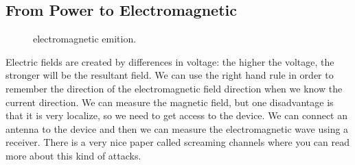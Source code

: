 \subsection { From Power to Electromagnetic }
\begin{figure}[h]
    \centering
    
    \caption{electromagnetic emition.} \label{fig:flipflop}
\end{figure}
Electric fields are created by differences in voltage: the higher the voltage, the stronger will be the resultant field. We can use the right hand rule in order to remember the direction of the electromagnetic field direction when we know the current direction. We can measure the magnetic field, but one disadvantage is that it is very localize, so we need to get access to the device. We can connect an antenna to the device and then we can measure the electromagnetic wave using a receiver. There is a very nice paper called screaming channels where you can read more about this kind of attacks.

